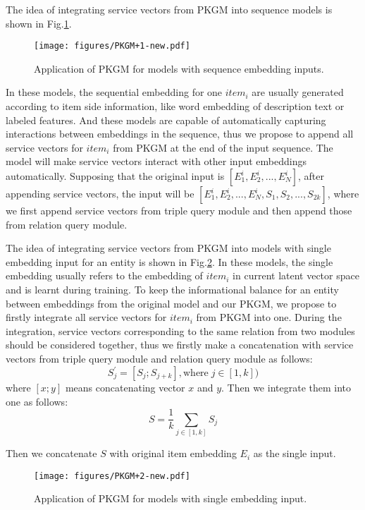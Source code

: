 The idea of integrating service vectors from PKGM into sequence models is shown in Fig.\ref{fig:PKGM+1}. 
\begin{figure}[!hbpt]
    \centering
    \texttt{[image: figures/PKGM+1-new.pdf]}
    \caption{Application of PKGM for models with sequence embedding inputs.}
    \label{fig:PKGM+1}
\end{figure}
In these models, the sequential embedding for one $item_i$ are usually generated according to item side information, like word embedding of description text or labeled features. And these models are capable of automatically capturing interactions between embeddings in the sequence, thus we propose to append all service vectors for $item_i$ from PKGM at the end of the input sequence. The model will make service vectors interact with other input embeddings automatically. Supposing that the original input is $[E_1^i, E_2^i, ..., E_N^i]$, after appending service vectors, the input will be  $[E_1^i, E_2^i, ..., E_N^i, S_1, S_2, ..., S_{2k}]$, where we first append service vectors from triple query module and then append those from relation query module. 


The idea of integrating service vectors from PKGM into  models with single embedding input for an entity is shown in Fig.\ref{fig:PKGM+2}. In these models, the single embedding usually refers to the embedding of $item_i$ in current latent vector space and is learnt during training. To keep the informational balance for an entity between embeddings from the original model and our PKGM, we propose to firstly integrate all service vectors for $item_i$ from PKGM into one. During the integration, service vectors corresponding to the same relation from two modules should be considered together, thus we firstly make a concatenation with service vectors from triple query module and relation query module as follows:
\begin{equation}
    S_j^\prime = [S_j;S_{j + k}], \text{where}\; j \in [1, k])
\end{equation}
where $[x;y]$ means concatenating vector $x$ and $y$. Then we integrate them into one as follows:
\begin{equation}
    S = \frac{1}{k}\sum_{j \in [1, k]} S_j
\end{equation}

Then we concatenate $S$ with original item embedding $E_i$ as the single input. 

\begin{figure}[!htbp]
    \centering
    \texttt{[image: figures/PKGM+2-new.pdf]}
    \caption{Application of PKGM for models with single embedding input.}
    \label{fig:PKGM+2}
\end{figure}
